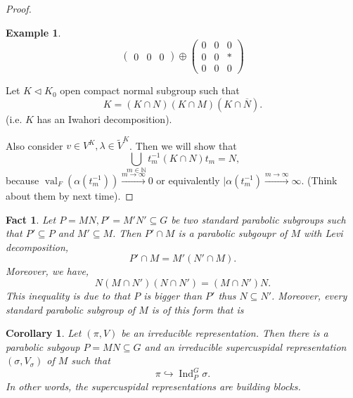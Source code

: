 \documentclass[8pt]{article}
\newtheorem{corollary}{Corollary} [section]
\newtheorem{fact}{Fact}[section]
\newtheorem{example}{Example}[section]
\DeclareMathOperator{\Ind}{Ind}
\DeclareMathOperator{\val}{val}
\newcommand{\N}[0]{\mathbb{N}}
\begin{document}
\begin{proof}
\begin{example}
\begin{equation*}
\begin{pmatrix}
      0 & 0& 0
    \end{pmatrix}\oplus
    \begin{pmatrix}
      0 & 0& 0\\
      0 & 0& \ast\\
      0 & 0& 0
    \end{pmatrix}
  \end{equation*}
    \end{example}
    Let $K\triangleleft K_0$ open compact normal subgroup such that 
    \begin{equation*}
      K = (K\cap N)(K\cap M)(K\cap\overline{N}).
    \end{equation*}
    (i.e. $K$ has an Iwahori decomposition).\\
    \par Also consider $v\in V^K,\lambda\in\widetilde{V}^K$. Then we will show that 
    \begin{equation*}
      \bigcup_{m\in\N} t_m^{-1}(K\cap N)t_m = N,
    \end{equation*}
    because $\val_F(\alpha(t_m^{-1}))\stackrel{m\to\infty}{\to} 0$ or equivalently $\vert \alpha(t_m^{-1})\stackrel{m\to\infty}{\to}\infty$. (Think about them by next time).
\end{proof}
\begin{fact}
  Let $P=MN,P'=M'N'\subseteq G$ be two standard parabolic subgroups such that $P'\subseteq P$ and $M'\subseteq M$. Then $P'\cap M$ is a parabolic subgoupr of $M$ with Levi decomposition,
  \begin{equation*}
    P'\cap M = M'(N'\cap M).
  \end{equation*}
  Moreover, we have,
  \begin{equation*}
    N(M\cap N')(N\cap N') = (M\cap N')N.
  \end{equation*}
  This inequality is due to that $P$ is bigger than $P'$ thus $N\subseteq N'$.
  Moreover, every standard parabolic subgroup of $M$ is of this form that is %
\end{fact}
\begin{corollary}
  \label{corollary_53}
  Let $(\pi,V)$ be an irreducible representation. Then there is a parabolic subgoup $P=MN\subseteq G$ and an irreducible supercuspidal representation $(\sigma,V_\sigma)$ of $M$ such that 
  \begin{equation*}
    \pi\hookrightarrow\Ind_P^G\sigma.
  \end{equation*}
  In other words, the supercuspidal representations are building blocks.
\end{corollary}
\end{document}
